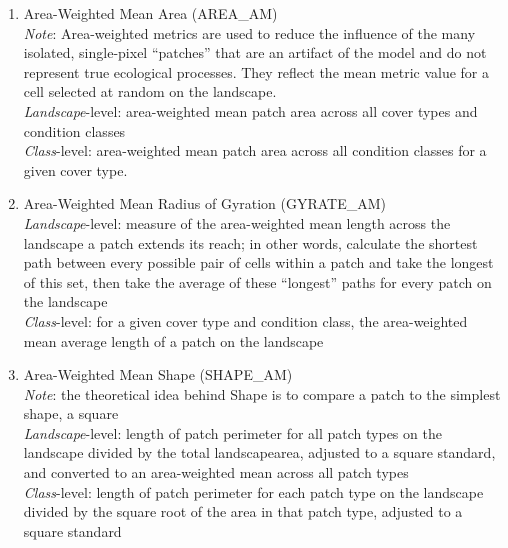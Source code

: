 \begin{itemize}
\begin{enumerate}
		\item Area-Weighted Mean Area (AREA\_AM)\\
		\emph{Note}: Area-weighted metrics are used to reduce the influence of the many isolated, single-pixel ``patches'' that are an artifact of the model and do not represent true ecological processes. They reflect the mean metric value for a cell selected at random on the landscape. 	\\
		\emph{Landscape}-level: area-weighted mean patch area across all cover types and condition classes \\
		\emph{Class}-level: area-weighted mean patch area across all condition classes for a given cover type. \\
		
		\item Area-Weighted Mean Radius of Gyration (GYRATE\_AM)\\
		\emph{Landscape}-level: measure of the area-weighted mean length across the landscape a patch extends its reach; in other words, calculate the shortest path between every possible pair of cells within a patch and take the longest of this set, then take the average of these ``longest'' paths for every patch on the landscape\\
		\emph{Class}-level: for a given cover type and condition class, the area-weighted mean average length of a patch on the landscape\\
		
		
		\item Area-Weighted Mean Shape (SHAPE\_AM)\\
		\emph{Note}: the theoretical idea behind Shape is to compare a patch to the simplest shape, a square 		\\
		\emph{Landscape}-level: length of patch perimeter for all patch types on the landscape divided by the total landscapearea, adjusted to a square standard, and converted to an area-weighted mean across all patch types \\
		\emph{Class}-level: length of patch perimeter for each patch type on the landscape divided by the square root of the area in that patch type, adjusted to a square standard\\
		

\end{enumerate}
\end{itemize}
